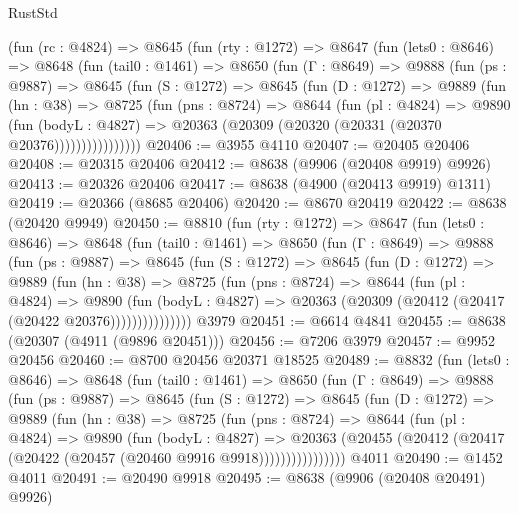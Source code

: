 \begin{lexlean}{RustStd}
\begin{coremodule}
    (fun (rc : @4824) =>
    @8645
      (fun (rty : @1272) =>
      @8647
        (fun (lets0 : @8646) =>
        @8648
          (fun (tail0 : @1461) =>
          @8650
            (fun (Γ : @8649) =>
            @9888
              (fun (ps : @9887) =>
              @8645
                (fun (S : @1272) =>
                @8645
                  (fun (D : @1272) =>
                  @9889
                    (fun (hn : @38) =>
                    @8725
                      (fun (pns : @8724) =>
                      @8644
                        (fun (pl : @4824) =>
                        @9890
                          (fun (bodyL : @4827) =>
                          @20363 (@20309 (@20320 (@20331 (@20370 @20376))))))))))))))))
@20406 := @3955 @4110
@20407 := @20405 @20406
@20408 := @20315 @20406
@20412 := @8638 (@9906 (@20408 @9919) @9926)
@20413 := @20326 @20406
@20417 := @8638 (@4900 (@20413 @9919) @1311)
@20419 := @20366 (@8685 @20406)
@20420 := @8670 @20419
@20422 := @8638 (@20420 @9949)
@20450 := @8810
    (fun (rty : @1272) =>
    @8647
      (fun (lets0 : @8646) =>
      @8648
        (fun (tail0 : @1461) =>
        @8650
          (fun (Γ : @8649) =>
          @9888
            (fun (ps : @9887) =>
            @8645
              (fun (S : @1272) =>
              @8645
                (fun (D : @1272) =>
                @9889
                  (fun (hn : @38) =>
                  @8725
                    (fun (pns : @8724) =>
                    @8644
                      (fun (pl : @4824) =>
                      @9890
                        (fun (bodyL : @4827) =>
                        @20363 (@20309 (@20412 (@20417 (@20422 @20376)))))))))))))))
    @3979
@20451 := @6614 @4841
@20455 := @8638 (@20307 (@4911 (@9896 @20451)))
@20456 := @7206 @3979
@20457 := @9952 @20456
@20460 := @8700 @20456 @20371 @18525
@20489 := @8832
    (fun (lets0 : @8646) =>
    @8648
      (fun (tail0 : @1461) =>
      @8650
        (fun (Γ : @8649) =>
        @9888
          (fun (ps : @9887) =>
          @8645
            (fun (S : @1272) =>
            @8645
              (fun (D : @1272) =>
              @9889
                (fun (hn : @38) =>
                @8725
                  (fun (pns : @8724) =>
                  @8644
                    (fun (pl : @4824) =>
                    @9890
                      (fun (bodyL : @4827) =>
                      @20363
                        (@20455 (@20412 (@20417 (@20422 (@20457 (@20460 @9916 @9918))))))))))))))))
    @4011
@20490 := @1452 @4011
@20491 := @20490 @9918
@20495 := @8638 (@9906 (@20408 @20491) @9926)

\end{coremodule}
\end{lexlean}
